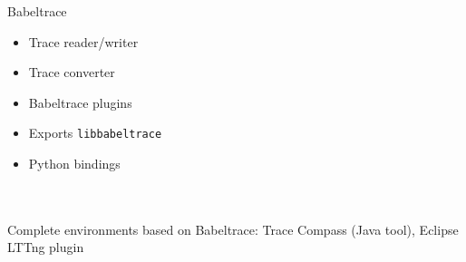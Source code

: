 \begin{frame}{Babeltrace}
\begin{itemize}
\item Trace reader/writer
\item Trace converter
\item Babeltrace plugins
\item Exports \texttt{libbabeltrace}
\item Python bindings
\end{itemize}
\hfill \\
\hfill \\
Complete environments based on Babeltrace: Trace Compass (Java tool), Eclipse
LTTng plugin
\end{frame}

